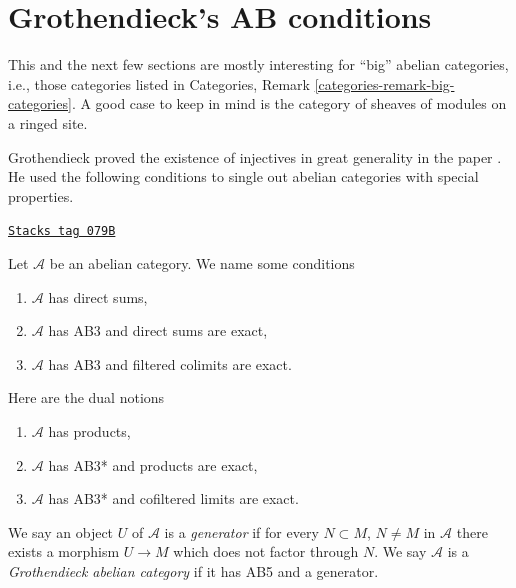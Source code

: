 \section{Grothendieck's AB conditions}
\label{injectives-section-grothendieck-conditions}
This and the next few sections are mostly interesting for ``big'' abelian
categories, i.e., those categories listed in
Categories, Remark \ref{categories-remark-big-categories}.
A good case to keep in mind is the category of sheaves of modules
on a ringed site.

\medskip\noindent
Grothendieck proved the existence of injectives in great generality
in the paper \cite{Tohoku}. He used the following conditions to single
out abelian categories with special properties.

\begin{definition}
\label{injectives-definition-grothendieck-conditions}
\href{https://stacks.math.columbia.edu/tag/079B}{\texttt{Stacks tag 079B}}

Let $\mathcal{A}$ be an abelian category. We name some conditions
\begin{enumerate}
\item[AB3] $\mathcal{A}$ has direct sums,
\item[AB4] $\mathcal{A}$ has AB3 and direct sums are exact,
\item[AB5] $\mathcal{A}$ has AB3 and filtered colimits are exact.
\end{enumerate}
Here are the dual notions
\begin{enumerate}
\item[AB3*] $\mathcal{A}$ has products,
\item[AB4*] $\mathcal{A}$ has AB3* and products are exact,
\item[AB5*] $\mathcal{A}$ has AB3* and cofiltered limits are exact.
\end{enumerate}
We say an object $U$ of $\mathcal{A}$ is a {\it generator} if
for every $N \subset M$, $N \not = M$ in $\mathcal{A}$ there exists a morphism
$U \to M$ which does not factor through $N$.
We say $\mathcal{A}$ is a {\it Grothendieck abelian category} if
it has AB5 and a generator.
\end{definition}

